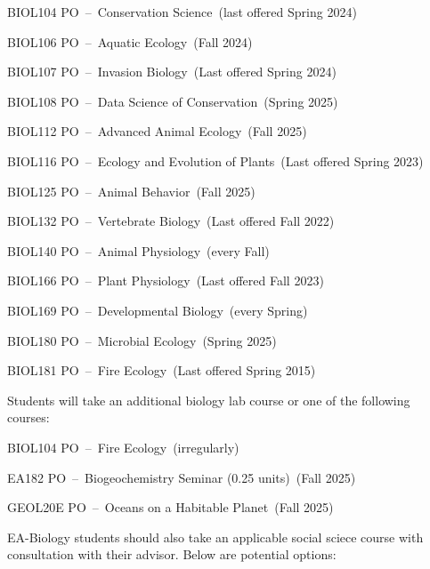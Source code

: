 \documentclass{article}\usepackage[]{graphicx}\usepackage[]{xcolor}
\newenvironment{itemize*}%
  {\begin{itemize}%
    \setlength{\itemsep}{0pt}%
    \setlength{\parskip}{0pt}}%
  {\end{itemize}}
\begin{document}
\begin{description}
\begin{itemize*}
  \item BIOL104 PO~--~Conservation Science~(last offered Spring 2024)
  \item BIOL106 PO~--~Aquatic Ecology~(Fall 2024)
  \item BIOL107 PO~--~Invasion Biology~(Last offered Spring 2024)
  \item BIOL108 PO~--~Data Science of Conservation~(Spring 2025)
  \item BIOL112 PO~--~Advanced Animal Ecology~(Fall 2025)
  \item BIOL116 PO~--~Ecology and Evolution of Plants~(Last offered Spring 2023)
  \item BIOL125 PO~--~Animal Behavior~(Fall 2025)
  \item BIOL132 PO~--~Vertebrate Biology~(Last offered Fall 2022)
  \item BIOL140 PO~--~Animal Physiology~(every  Fall)
  \item BIOL166 PO~--~Plant Physiology~(Last  offered Fall 2023)
  \item BIOL169 PO~--~Developmental Biology~(every Spring)
  \item BIOL180 PO~--~Microbial Ecology~(Spring 2025)
  \item BIOL181 PO~--~Fire Ecology~(Last offered Spring 2015)
\end{itemize*}

\item[Seminar and Geology Options] Students will take an additional biology lab course or one of the following courses:

\begin{itemize*}
  \item BIOL104 PO~--~Fire Ecology~(irregularly)
  \item EA182 PO~--~Biogeochemistry Seminar (0.25 units)~(Fall 2025)
  \item GEOL20E PO~--~Oceans on a Habitable Planet~(Fall 2025)
\end{itemize*}

\item[Social Sciences] EA-Biology students should also take an applicable social sciece course with consultation with their advisor. Below are potential options: 


\end{description}
\end{document}

